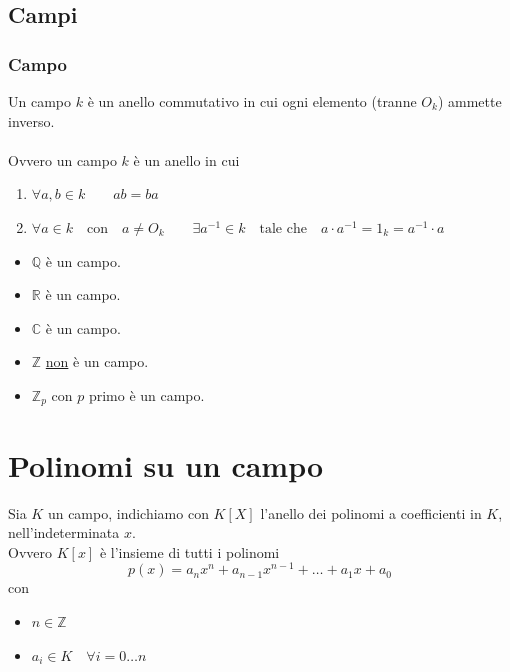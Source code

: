 \documentclass[a4paper,12pt, oneside]{book}
\begin{document}
	\section{Campi}
		\subsection{Campo}
			
				\begin{definizione}[Campo]
					Un campo $k$ è un anello commutativo in cui ogni elemento (tranne $O_k$) ammette inverso.\\\\
					Ovvero un campo $k$ è un anello in cui
					\begin{enumerate}
						\item $\forall a,b \in k \qquad ab=ba$
						\item $\forall a \in k \quad \mbox{con} \quad a \not = O_k \qquad \exists a^{-1}  \in k \quad \mbox{tale che} \quad a \cdot a^{-1} = 1_k = a^{-1} \cdot a$
					\end{enumerate}
				\end{definizione}
				
				\begin{shaded}
					\begin{esempio}
						\begin{itemize}
							Esempi pratici:
							\item $\mathbb{Q}$ è un campo.
							\item $\mathbb{R}$ è un campo.
							\item $\mathbb{C}$ è un campo.
							\item $\mathbb{Z}$ \underline{non} è un campo.
							\item $\mathbb{Z}_{p}$ con $p$ primo è un campo.
						\end{itemize}
					\end{esempio}
				\end{shaded}
				
\chapter{Polinomi su un campo}
	Sia $K$ un campo, indichiamo con $K[X]$ l'anello dei polinomi a coefficienti in $K$, nell'indeterminata $x$.\\
	Ovvero $K[x]$ è l'insieme di tutti i polinomi
	$$p(x) = a_{n}x^{n} + a_{n-1}x^{n-1} + \dots + a_{1}x + a_{0}$$
	con \begin{itemize}
		\item $n \in \mathbb{Z}$
		\item $a_i \in K \quad \forall i = 0 \dots n$
	\end{itemize}
	
\end{document}
